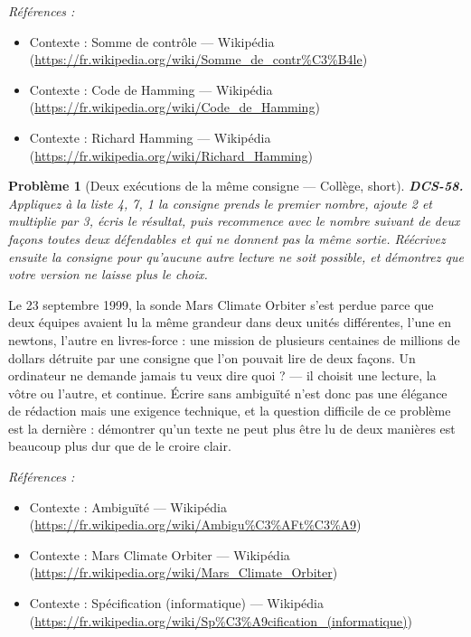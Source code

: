 \documentclass[11pt]{article}
\newtheorem{problem}{Problème}
\newenvironment{refs}{\par\small\noindent\emph{Références :}\begin{itemize}\setlength\itemsep{0pt}}{\end{itemize}\normalsize}
\begin{document}
\begin{refs}
\item Contexte : Somme de contrôle --- Wikipédia (\url{https://fr.wikipedia.org/wiki/Somme_de_contr%C3%B4le})
\item Contexte : Code de Hamming --- Wikipédia (\url{https://fr.wikipedia.org/wiki/Code_de_Hamming})
\item Contexte : Richard Hamming --- Wikipédia (\url{https://fr.wikipedia.org/wiki/Richard_Hamming})
\end{refs}

\bigskip

\begin{problem}[{Deux exécutions de la même consigne --- Collège, short}]
\textbf{DCS-58.} Appliquez à la liste 4, 7, 1 la consigne \og{} prends le
premier nombre, ajoute 2 et multiplie par 3, écris le résultat, puis recommence avec le
nombre suivant \fg{} de deux façons toutes deux défendables et qui ne donnent pas la même sortie.
Réécrivez ensuite la consigne pour qu'aucune autre lecture ne soit possible, et démontrez que
votre version ne laisse plus le choix.
\end{problem}

\noindent Le 23 septembre 1999, la sonde Mars Climate Orbiter s'est perdue parce que
deux équipes avaient lu la même grandeur dans deux unités différentes, l'une en newtons,
l'autre en livres-force : une mission de plusieurs centaines de millions de dollars détruite
par une consigne que l'on pouvait lire de deux façons. Un ordinateur ne
demande jamais \og{} tu veux dire quoi ? \fg{} --- il choisit une lecture, la vôtre ou l'autre, et
continue. Écrire sans ambiguïté n'est donc pas une élégance de rédaction mais une exigence
technique, et la question difficile de ce problème est la dernière : démontrer qu'un texte
ne peut plus être lu de deux manières est beaucoup plus dur que de le croire clair.

\begin{refs}
\item Contexte : Ambiguïté --- Wikipédia (\url{https://fr.wikipedia.org/wiki/Ambigu%C3%AFt%C3%A9})
\item Contexte : Mars Climate Orbiter --- Wikipédia (\url{https://fr.wikipedia.org/wiki/Mars_Climate_Orbiter})
\item Contexte : Spécification (informatique) --- Wikipédia (\url{https://fr.wikipedia.org/wiki/Sp%C3%A9cification_(informatique)})
\end{refs}

\bigskip
\end{document}
